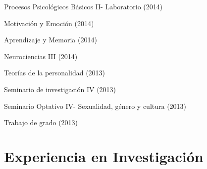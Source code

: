 \documentclass[11pt,a4paper,]{awesome-cv}
\begin{document}
\begin{cventries}
{\begin{cvitems}
\item Procesos Psicológicos Básicos II- Laboratorio (2014)
\item Motivación y Emoción (2014)
\item Aprendizaje y Memoria (2014)
\item Neurociencias III (2014)
\item Teorías de la personalidad (2013)
\item Seminario de investigación IV (2013)
\item Seminario Optativo IV- Sexualidad, género y cultura (2013)
\item Trabajo de grado (2013)
\end{cvitems}}
\end{cventries}

\section{Experiencia en
Investigación}\label{experiencia-en-investigaciuxf3n}
\end{document}
